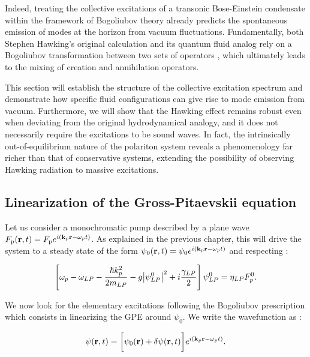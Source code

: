 Indeed, treating the collective excitations of a transonic Bose-Einstein condensate within the framework of Bogoliubov theory already predicts the spontaneous emission of modes at the horizon from vacuum fluctuations. Fundamentally, both Stephen Hawking's original calculation and its quantum fluid analog rely on a Bogoliubov transformation between two sets of operators \cite{hawking_black_1972}, which ultimately leads to the mixing of creation and annihilation operators.

This section will establish the structure of the collective excitation spectrum and demonstrate how specific fluid configurations can give rise to mode emission from vacuum. Furthermore, we will show that the Hawking effect remains robust even when deviating from the original hydrodynamical analogy, and it does not necessarily require the excitations to be sound waves. 
In fact, the intrinsically out-of-equilibrium nature of the polariton system reveals a phenomenology far richer than that of conservative systems, extending the possibility of observing Hawking radiation to massive excitations.



\subsection{Linearization of the Gross-Pitaevskii equation}

Let us consider a monochromatic pump described by a plane wave $F_{\mathrm{p}}(\mathbf{r},t)=F_{\mathrm{p}}e^{i(\mathbf{k}_p \mathbf{r} -\omega_pt)}$. As explained in the previous chapter, this will drive the system
to a steady state of the form $\psi_0(\mathbf{r},t)=\psi_0e^{i(\mathbf{k}_p \mathbf{r} -\omega_pt)}$ and respecting :

\begin{equation}
    \left[\omega_p -\omega_{LP} - \dfrac{\hbar k_p^2}{2 m_{LP}} - g \abs{\psi_{LP}^0}^2 + i \dfrac{\gamma_{LP}}{2} \right] \psi_{LP}^0= \eta_{LP} F_p^0.
    \label{eq:steady_state}
\end{equation}

We now look for the elementary excitations following the Bogoliubov prescription which consists in linearizing the GPE around $\psi_0$. We write the wavefunction as :

\begin{equation}
    \psi(\mathbf{r},t)=\biggl[\psi_0(\mathbf{r})+\delta\psi(\mathbf{r},t)\biggr]e^{i(\mathbf{k}_p \mathbf{r} -\omega_pt)}.
    \label{eq:linearization_ansatz}
\end{equation}

